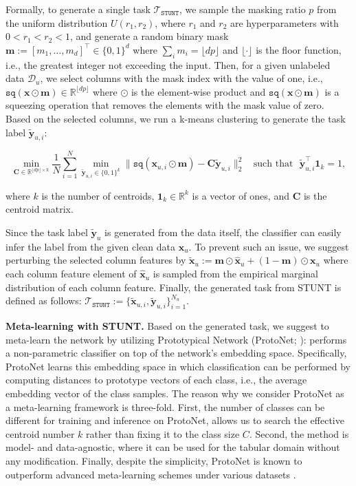 Formally, to generate a single task $\mathcal{T}_{\mathtt{STUNT}}$,
we sample the masking ratio $p$ from the uniform distribution $U(r_1, r_2)$, where $r_1$ and $r_2$ are hyperparameters with $0<r_1<r_2<1$, and generate a random binary mask ${\mathbf{m}}:=[m_1,\dots,m_d]^{\top}\in\{0,1\}^{d}$ where $\sum_{i}m_i=\lfloor dp\rfloor$ and $\lfloor\cdot\rfloor$ is the floor function, i.e., the greatest integer not exceeding the input. Then, for a given unlabeled data
$\mathcal{D}_u$,
we select columns with the mask index with the value of one, i.e., $\mathtt{sq}({\mathbf{x}}\odot{\mathbf{m}})\in{\mathbb{R}}^{\lfloor dp\rfloor}$ where 
$\odot$ is the element-wise product and
$\mathtt{sq}({\mathbf{x}}\odot{\mathbf{m}})$ is a squeezing operation that removes the elements with the mask value of zero. Based on the selected columns, we run a k-means clustering to generate the task label $\tilde{{\mathbf{y}}}_{u,i}$:

\begin{equation}
    \min_{{\mathbf{C}}\in{\mathbb{R}}^{\lfloor dp\rfloor\times k}} \frac{1}{N}\sum_{i=1}^{N} \min_{\tilde{{\mathbf{y}}}_{u, i}\in\{0,1\}^{k}} \lVert \mathtt{sq}({\mathbf{x}}_{u, i}\odot{\mathbf{m}}) - {\mathbf{C}} \tilde{{\mathbf{y}}}_{u, i}\rVert_{2}^{2}~~~~\text{such that}~~~\tilde{{\mathbf{y}}}_{u, i}^{\top} \mathbf{1}_k=1,
    \label{eq:k_means}
\end{equation}

where $k$ is the number of centroids, $\mathbf{1}_k\in\mathbb{R}^{k}$ is a vector of ones, and ${\mathbf{C}}$ is the centroid matrix.

Since the task label $\tilde{{\mathbf{y}}}_{u}$ is generated from the data itself, the classifier can easily infer the label from the given clean data ${\mathbf{x}}_u$. To prevent such an issue, we suggest perturbing the selected column features by $\tilde{{\mathbf{x}}}_u:={\mathbf{m}} \odot \hat{{\mathbf{x}}}_u + (1-{\mathbf{m}})\odot {\mathbf{x}}_u$ where each column feature element of $\hat{{\mathbf{x}}}_u$ is sampled from the empirical marginal distribution of each column feature. Finally, the generated task from STUNT is defined as follows: $\mathcal{T}_{\mathtt{STUNT}}:=\{\tilde{{\mathbf{x}}}_{u, i},\tilde{{\mathbf{y}}}_{u, i}\}_{i=1}^{N_u}$.

\textbf{Meta-learning with STUNT.} Based on the generated task, we suggest to meta-learn the network by utilizing Prototypical Network (ProtoNet; \cite{snell2017proto}): performs a non-parametric classifier on top of the network's embedding space. Specifically, ProtoNet learns this embedding space in which classification can be performed by computing distances to prototype vectors of each class, i.e., the average embedding vector of the class samples. The reason why we consider ProtoNet as a meta-learning framework is three-fold. First, the number of classes can be different for training and inference on ProtoNet, allows us to search the effective centroid number $k$ rather than fixing it to the class size $C$. Second, the method is model- and data-agnostic, where it can be used for the tabular domain without any modification. Finally, despite the simplicity, ProtoNet is known to outperform advanced meta-learning schemes under various datasets \citep{ye2020few,tack2022meta}.

